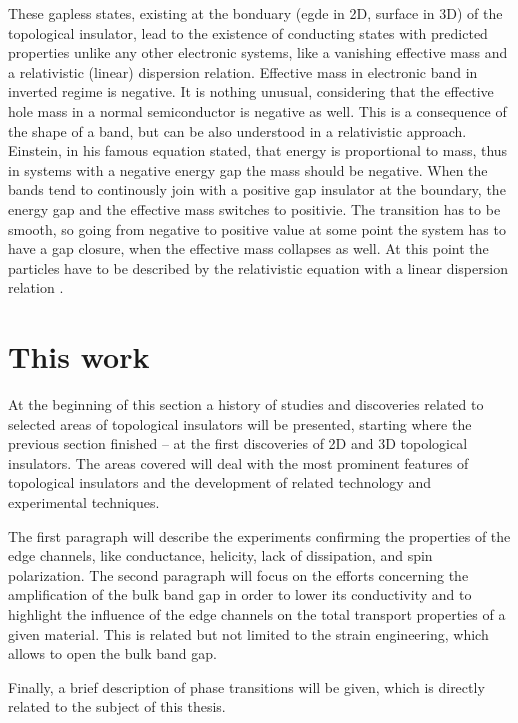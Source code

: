 \documentclass[titlepage,a4paper]{book}
\newcommand{\wciecie}{\quad\phantom{v}}
\begin{document}
These gapless states, existing at the bonduary (egde in 2D, surface in 3D) of the topological insulator, lead to the existence of conducting states with predicted properties unlike any other electronic systems, like a vanishing effective mass and a relativistic (linear) dispersion relation. Effective mass in electronic band in inverted regime is negative. It is nothing unusual, considering that the effective hole mass in a normal semiconductor is negative as well. This is a consequence of the shape of a band, but can be also understood in a relativistic approach. Einstein, in his famous equation stated, that energy is proportional to mass, thus in systems with a negative energy gap the mass should be negative. When the bands tend to continously join with a positive gap insulator at the boundary, the energy gap and the effective mass switches to positivie. The transition has to be smooth, so going from negative to positive value at some point the system has to have a gap closure, when the effective mass collapses as well. At this point the particles have to be described by the relativistic equation with a linear dispersion relation \cite{Zawadzki_Topology}.


\section{This work}
\wciecie
At the beginning of this section a history of studies and discoveries related to selected areas of topological insulators will be presented, starting where the previous section finished -- at the first discoveries of 2D and 3D topological insulators. The areas covered will deal with the most prominent features of topological insulators and the development of related technology and experimental techniques. 

The first paragraph will describe the experiments confirming the properties of the edge channels, like conductance, helicity, lack of dissipation, and spin polarization. The second paragraph will focus on the efforts concerning the amplification of the bulk band gap in order to lower its conductivity and to highlight the influence of the edge channels on the total transport properties of a given material. This is related but not limited to the strain engineering, which allows to open the bulk band gap.

Finally, a brief description of phase transitions will be given, which is directly related to the subject of this thesis. 
\end{document}

